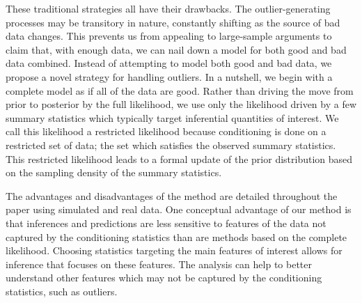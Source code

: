 \documentclass[ba]{imsart}
\newcommand{\response}[1]{{\color{blue}#1}}
\begin{document}
These traditional strategies  all have their drawbacks.  The outlier-generating processes 
may be transitory in nature, constantly shifting as the source of bad data changes.  This prevents us from appealing to large-sample arguments to claim that, with enough data, we can nail down a model for both good and bad data combined.  Instead of attempting to model both good and bad data, we propose a novel strategy for handling outliers. In a nutshell, we begin with a complete model  as if all of the data are good. Rather than driving the move from prior to posterior  by the full likelihood, we use only the likelihood driven by a few summary statistics which typically target inferential quantities
of interest.  We call this likelihood a restricted likelihood because conditioning is done on a restricted set of data; the set which satisfies the observed summary statistics. This restricted likelihood leads to a formal update of the prior distribution based on the sampling density of the summary statistics. 

\response{The advantages and disadvantages of the method are detailed throughout the paper using simulated and real data. One conceptual advantage of our method is that inferences and predictions are less sensitive to features of the data not captured by
the conditioning statistics than are methods based on the complete likelihood. Choosing statistics targeting the main features of interest allows for inference that focuses on these features. The analysis can help to better understand other features which may not be captured by the conditioning statistics, such as outliers.} 
\end{document}
